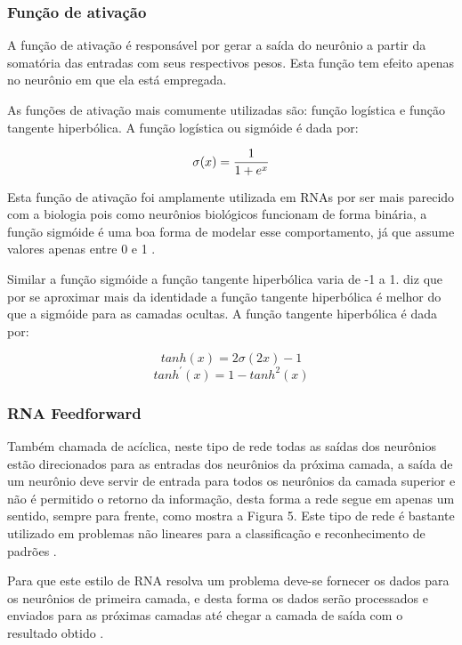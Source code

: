  \subsubsection{Função de ativação}
 A função de ativação é responsável por gerar a saída do neurônio a partir da somatória das entradas com seus respectivos pesos. Esta função tem efeito apenas no neurônio em que ela está empregada.

As funções de ativação mais comumente utilizadas são: função logística e função tangente hiperbólica. A função logística ou sigmóide é dada por:

$${\sigma(x) = {1\over 1+e^x}}$$

Esta função de ativação foi amplamente utilizada em RNAs por ser mais parecido com a biologia pois como neurônios biológicos funcionam de forma binária, a função sigmóide é uma boa forma de modelar esse comportamento, já que assume valores apenas entre 0 e 1 \cite{FACURE}.

Similar a função sigmóide a função tangente hiperbólica varia de -1 a 1.  diz que por se aproximar mais da identidade a função tangente hiperbólica é melhor do que a sigmóide para as camadas ocultas. A função tangente hiperbólica é dada por:

 $${{tanh(x) = 2\sigma(2x)-1}}$$
 $${{{tanh^'}(x) = 1-{tanh^2}(x)}}$$
 
 \subsubsection{RNA Feedforward}
 Também chamada de acíclica, neste tipo de rede todas as saídas dos neurônios estão direcionados para as entradas dos neurônios da próxima camada, a saída de um neurônio deve servir de entrada para todos os neurônios da camada superior e não é permitido o retorno da informação, desta forma a rede segue em apenas um sentido, sempre para frente, como mostra a Figura 5. Este tipo de rede é bastante utilizado em problemas não lineares para a classificação e reconhecimento de padrões \cite{INTRODUCAO}.

Para que este estilo de RNA resolva um problema deve-se fornecer os dados para os neurônios de primeira camada, e desta forma os dados serão processados e enviados para as próximas camadas até chegar a camada de saída com o resultado obtido \cite{GIACOMELL}.


